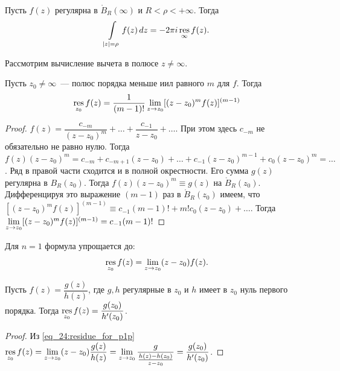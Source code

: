 \begin{statement}
Пусть \(f(z)\) регулярна в \(\mathring{B}_R(\infty)\) и \(R < \rho < + \infty\). Тогда
\begin{equation}
    \int\limits_{|z| = \rho} f(z) \, dz = - 2 \pi i \operatorname*{res}\limits_{\infty} f(z).
\end{equation}
\end{statement}

Рассмотрим вычисление вычета в полюсе \(z \ne \infty\).

\begin{statement}
Пусть \(z_0 \ne \infty\)~--- полюс порядка меньше иил равного \(m\) для \(f\). Тогда
\begin{equation}
    \operatorname*{res}\limits_{z_0} f(z) = \dfrac{1}{(m-1)!} \lim\limits_{z \to z_0} [(z - z_0)^m f(z)]^{(m - 1)}
\end{equation}
\end{statement}

\begin{proof}
\(f(z) = \dfrac{c_{-m}}{(z - z_0)^m} + \dots + \dfrac{c_{-1}}{z - z_0} + \dots\). При этом здесь
\(c_{-m}\) не обязательно не равно нулю. Тогда \(f(z) (z - z_0)^m = c_{-m} + c_{-m + 1} (z - z_0)
+ \dots + c_{-1} (z - z_0)^{m - 1} + c_0 (z - z_0)^m = \dots\). Ряд в правой части сходится и в
полной окрестности. Его сумма \(g(z)\) регулярна в \(B_R(z_0)\). Тогда
\(f(z)(z - z_0)^m \equiv g(z)\) на \(\mathring{B}_R(z_0)\). Дифференцируя это выражение \((m - 1)\)
раз в \(\mathring{B}_R(z_0)\) имеем, что \([(z - z_0)^m f(z)]^{(m - 1)} \equiv c_{-1} (m-1)! + m!
c_0 (z - z_0) + \dots\). Тогда \(\lim\limits_{z \to z_0} [(z - z_0)^m f(z)]^{(m - 1)} \hm= c_{-1}
(m-1)!\)
\end{proof}

\begin{note}
Для \(n = 1\) формула упрощается до:
\begin{equation}
    \operatorname*{res}\limits_{z_0} f(z) = \lim\limits_{z \to z_0} (z - z_0) f(z). \label{eq_24:residue_for_p1p}
\end{equation}
\end{note}

\begin{statement}
Пусть \(f(z) = \dfrac{g(z)}{h(z)}\), где \(g, h\) регулярные в \(z_0\) и \(h\) имеет в \(z_0\)
нуль первого порядка. Тогда \(\operatorname*{res}\limits_{z_0} f(z) = \dfrac{g(z_0)}{h'(z_0)}\).
\end{statement}

\begin{proof}
Из \eqref{eq_24:residue_for_p1p} \(\operatorname*{res}\limits_{z_0} f(z) = \lim\limits_{z \to z_0} (z - z_0)
\dfrac{g(z)}{h(z)} = \lim\limits_{z \to z_0} \dfrac{g}{\frac{h(z) - h(z_0)}{z - z_0}} =
\dfrac{g(z_0)}{h'(z_0)}\).
\end{proof}

